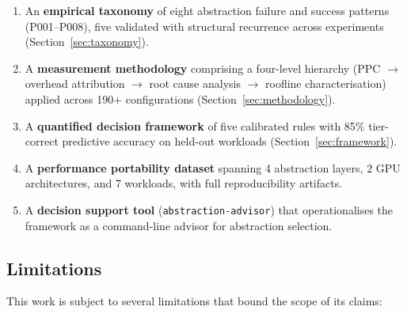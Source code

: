 \begin{enumerate}
    \item An \textbf{empirical taxonomy} of eight abstraction failure and
    success patterns (P001--P008), five validated with structural recurrence
    across experiments (Section~\ref{sec:taxonomy}).

    \item A \textbf{measurement methodology} comprising a four-level
    hierarchy (PPC $\rightarrow$ overhead attribution $\rightarrow$ root
    cause analysis $\rightarrow$ roofline characterisation) applied across
    190+ configurations (Section~\ref{sec:methodology}).

    \item A \textbf{quantified decision framework} of five calibrated rules
    with 85\% tier-correct predictive accuracy on held-out workloads
    (Section~\ref{sec:framework}).

    \item A \textbf{performance portability dataset} spanning 4 abstraction
    layers, 2 GPU architectures, and 7 workloads, with full reproducibility
    artifacts.

    \item A \textbf{decision support tool}
    (\texttt{abstraction-advisor}) that operationalises the framework as a
    command-line advisor for abstraction selection.
\end{enumerate}

\subsection*{Limitations}

This work is subject to several limitations that bound the scope of its
claims:


